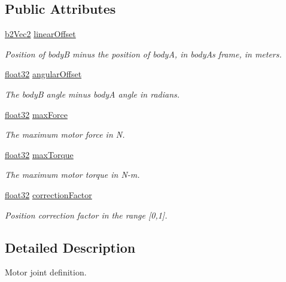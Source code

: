 \subsection*{Public Attributes}
\begin{DoxyCompactItemize}
\item 
\mbox{\hyperlink{structb2_vec2}{b2\+Vec2}} \mbox{\hyperlink{structb2_motor_joint_def_a2c957cffc2af66c6c8077c069b906bc4}{linear\+Offset}}
\begin{DoxyCompactList}\small\item\em Position of bodyB minus the position of bodyA, in bodyA\textquotesingle{}s frame, in meters. \end{DoxyCompactList}\item 
\mbox{\hyperlink{b2_settings_8h_aacdc525d6f7bddb3ae95d5c311bd06a1}{float32}} \mbox{\hyperlink{structb2_motor_joint_def_abdb42eff4aeff1d48038e084c57e1cb0}{angular\+Offset}}
\begin{DoxyCompactList}\small\item\em The bodyB angle minus bodyA angle in radians. \end{DoxyCompactList}\item 
\mbox{\hyperlink{b2_settings_8h_aacdc525d6f7bddb3ae95d5c311bd06a1}{float32}} \mbox{\hyperlink{structb2_motor_joint_def_a2f66d1b99c654e112dc68e15375d5ee7}{max\+Force}}
\begin{DoxyCompactList}\small\item\em The maximum motor force in N. \end{DoxyCompactList}\item 
\mbox{\hyperlink{b2_settings_8h_aacdc525d6f7bddb3ae95d5c311bd06a1}{float32}} \mbox{\hyperlink{structb2_motor_joint_def_afcf5dd58166917a4574d1f28f6bb3660}{max\+Torque}}
\begin{DoxyCompactList}\small\item\em The maximum motor torque in N-\/m. \end{DoxyCompactList}\item 
\mbox{\hyperlink{b2_settings_8h_aacdc525d6f7bddb3ae95d5c311bd06a1}{float32}} \mbox{\hyperlink{structb2_motor_joint_def_ab282afdb92d07ead23530f57fd0eb9ea}{correction\+Factor}}
\begin{DoxyCompactList}\small\item\em Position correction factor in the range \mbox{[}0,1\mbox{]}. \end{DoxyCompactList}\end{DoxyCompactItemize}


\subsection{Detailed Description}
Motor joint definition. 

